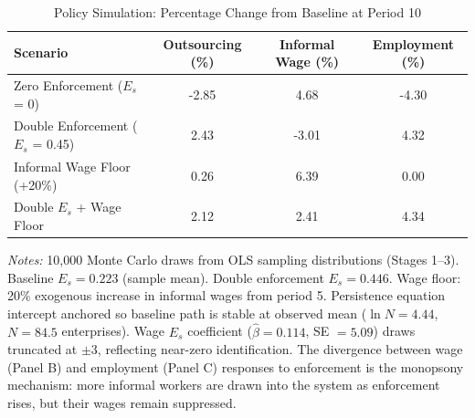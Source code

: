 \begin{table}[ht]
  \centering
  \caption{Policy Simulation: Percentage Change from Baseline at Period 10}
  \label{tab:policy_simulation}
  \small
  \begin{tabular}{lccc}
    \toprule
    Scenario & Outsourcing (\%) & Informal Wage (\%) & Employment (\%) \\
    \midrule
    Zero Enforcement ($E_s$ = 0) & -2.85 & 4.68 & -4.30 \\
    Double Enforcement ($E_s$ = 0.45) & 2.43 & -3.01 & 4.32 \\
    Informal Wage Floor (+20\%) & 0.26 & 6.39 & 0.00 \\
    Double $E_s$ + Wage Floor & 2.12 & 2.41 & 4.34 \\
    \bottomrule
  \end{tabular}
  \medskip
  \begin{minipage}{\linewidth}\footnotesize
    \textit{Notes:} 10,000 Monte Carlo draws from OLS sampling
    distributions (Stages 1--3). Baseline $E_s = 0.223$ (sample mean).
    Double enforcement $E_s = 0.446$. Wage floor: 20\% exogenous
    increase in informal wages from period 5.
    Persistence equation intercept anchored so baseline path is stable at
    observed mean ($\ln N = 4.44$, $N = 84.5$ enterprises).
    Wage $E_s$ coefficient ($\hat{\beta} = 0.114$, SE $= 5.09$)
    draws truncated at $\pm 3$, reflecting near-zero identification.
    The divergence between wage (Panel B) and employment (Panel C)
    responses to enforcement is the monopsony mechanism:
    more informal workers are drawn into the system as enforcement rises,
    but their wages remain suppressed.
  \end{minipage}
\end{table}
